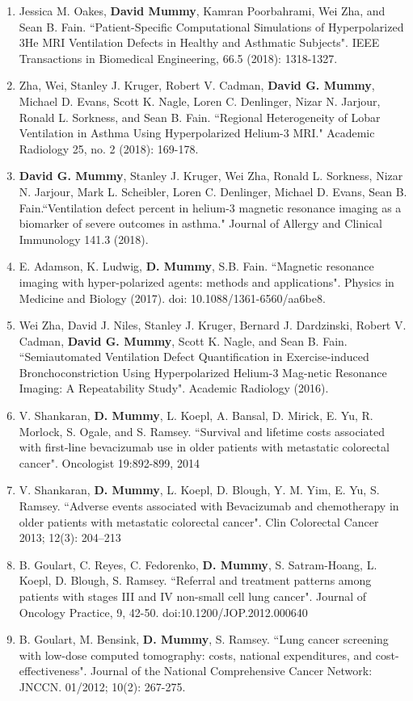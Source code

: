 \documentclass[10pt]{article}
\begin{document}
\begin{enumerate}
\item Jessica M. Oakes, {\bf David Mummy}, Kamran Poorbahrami, Wei Zha, and Sean B. Fain. ``Patient-Specific Computational Simulations of Hyperpolarized 3He MRI Ventilation Defects in Healthy and Asthmatic Subjects". IEEE Transactions in Biomedical Engineering, 66.5 (2018): 1318-1327.
\item Zha, Wei, Stanley J. Kruger, Robert V. Cadman, {\bf David G. Mummy}, Michael D. Evans, Scott K. Nagle, Loren C. Denlinger, Nizar N. Jarjour, Ronald L. Sorkness, and Sean B. Fain. ``Regional Heterogeneity of Lobar Ventilation in Asthma Using Hyperpolarized Helium-3 MRI." Academic Radiology 25, no. 2 (2018): 169-178.
\item {\bf David G. Mummy}, Stanley J. Kruger, Wei Zha, Ronald L. Sorkness, Nizar N. Jarjour, Mark L. Scheibler, Loren C. Denlinger, Michael D. Evans, Sean B. Fain.``Ventilation defect percent in helium-3 magnetic resonance imaging as a biomarker of severe outcomes in asthma." Journal of Allergy and Clinical Immunology 141.3 (2018). 
\item E. Adamson, K. Ludwig, {\bf D. Mummy}, S.B. Fain. ``Magnetic resonance imaging with hyper-polarized agents: methods and applications". Physics in Medicine and Biology (2017). doi: 10.1088/1361-6560/aa6be8.
    \item Wei Zha, David J. Niles, Stanley J. Kruger, Bernard J. Dardzinski, Robert V. Cadman, {\bf David G. Mummy}, Scott K. Nagle, and Sean B. Fain. ``Semiautomated Ventilation Defect Quantification in Exercise-induced Bronchoconstriction Using Hyperpolarized Helium-3 Mag-netic Resonance Imaging: A Repeatability Study". Academic Radiology (2016).
    \item V. Shankaran, {\bf D. Mummy}, L. Koepl, A. Bansal, D. Mirick, E. Yu, R. Morlock, S. Ogale, and S. Ramsey. ``Survival and lifetime costs associated with first-line bevacizumab use in older patients with metastatic colorectal cancer". Oncologist 19:892-899, 2014
    \item V. Shankaran, {\bf D. Mummy}, L. Koepl, D. Blough, Y. M. Yim, E. Yu, S. Ramsey. ``Adverse events associated with Bevacizumab and chemotherapy in older patients with metastatic colorectal cancer". Clin Colorectal Cancer 2013; 12(3): 204–213
	\item B. Goulart, C. Reyes, C. Fedorenko, {\bf D. Mummy}, S. Satram-Hoang, L. Koepl, D. Blough, S. Ramsey. ``Referral and treatment patterns among patients with stages III and IV non-small cell lung cancer". Journal of Oncology Practice, 9, 42-50. doi:10.1200/JOP.2012.000640
	\item B. Goulart, M. Bensink, {\bf D. Mummy}, S. Ramsey. ``Lung cancer screening with low-dose computed tomography: costs, national expenditures, and cost-effectiveness". Journal of the National Comprehensive Cancer Network: JNCCN. 01/2012; 10(2): 267-275.
\end{enumerate}
\end{document}

